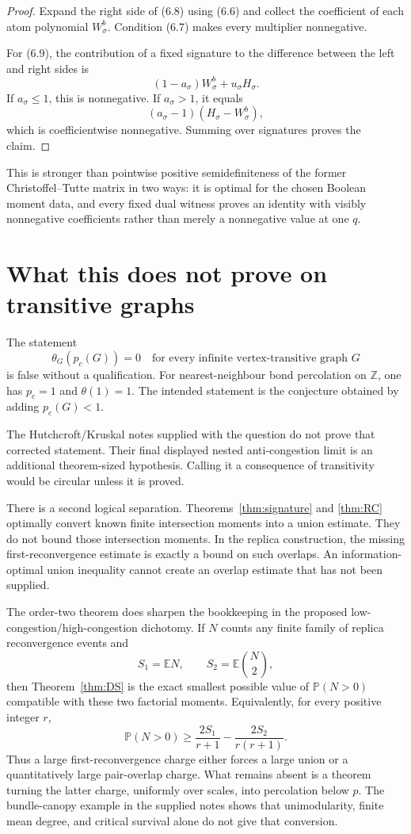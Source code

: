 \documentclass[11pt]{article}
\theoremstyle{definition}
\theoremstyle{remark}
\newcommand{\E}{\mathbb E}
\newcommand{\Pp}{\mathbb P}
\begin{document}
\begin{proof}
Expand the right side of (6.8) using (6.6) and collect the coefficient of
each atom polynomial $W^b_\sigma$.  Condition (6.7) makes every multiplier
nonnegative.

For (6.9), the contribution of a fixed signature to the difference between
the left and right sides is
\[
 (1-a_\sigma)W^b_\sigma+u_\sigma H_\sigma.
\]
If $a_\sigma\leq1$, this is nonnegative.  If $a_\sigma>1$, it equals
\[
 (a_\sigma-1)(H_\sigma-W^b_\sigma),
\]
which is coefficientwise nonnegative.  Summing over signatures proves the
claim.
\end{proof}

This is stronger than pointwise positive semidefiniteness of the former
Christoffel--Tutte matrix in two ways: it is optimal for the chosen Boolean
moment data, and every fixed dual witness proves an identity with visibly
nonnegative coefficients rather than merely a nonnegative value at one
$q$.

\section{What this does not prove on transitive graphs}

The statement
\[
 \theta_G(p_c(G))=0
 \quad\text{for every infinite vertex-transitive graph }G
 \tag{7.1}
\]
is false without a qualification.  For nearest-neighbour bond percolation
on $\mathbb Z$, one has $p_c=1$ and $\theta(1)=1$.  The intended statement
is the conjecture obtained by adding $p_c(G)<1$.

The Hutchcroft/Kruskal notes supplied with the question do not prove that
corrected statement.  Their final displayed nested anti-congestion limit is
an additional theorem-sized hypothesis.  Calling it a consequence of
transitivity would be circular unless it is proved.

There is a second logical separation.  Theorems~\ref{thm:signature} and
\ref{thm:RC} optimally convert known finite intersection moments into a
union estimate.  They do not bound those intersection moments.  In the
replica construction, the missing first-reconvergence estimate is exactly
a bound on such overlaps.  An information-optimal union inequality cannot
create an overlap estimate that has not been supplied.

The order-two theorem does sharpen the bookkeeping in the proposed
low-congestion/high-congestion dichotomy.  If $N$ counts any finite family
of replica reconvergence events and
\[
 S_1=\E N,\qquad S_2=\E\binom N2,
\]
then Theorem~\ref{thm:DS} is the exact smallest possible value of
$\Pp(N>0)$ compatible with these two factorial moments.  Equivalently, for
every positive integer $r$,
\[
 \Pp(N>0)\geq
 \frac{2S_1}{r+1}-\frac{2S_2}{r(r+1)}.
 \tag{7.2}
\]
Thus a large first-reconvergence charge either forces a large union or a
quantitatively large pair-overlap charge.  What remains absent is a theorem
turning the latter charge, uniformly over scales, into percolation below
$p$.  The bundle-canopy example in the supplied notes shows that
unimodularity, finite mean degree, and critical survival alone do not give
that conversion.
\end{document}
